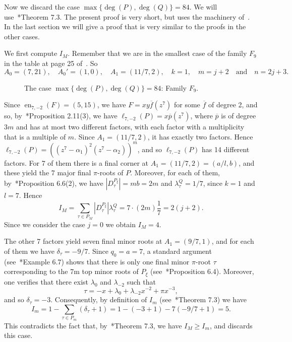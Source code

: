 \documentclass[reqno,a4paper,twoside]{amsart}
\theoremstyle{definition}
\theoremstyle{remark}
\DeclareMathOperator{\en}{en}
\newcommand{\ov}{\overline}
\begin{document}
Now we discard the case $\max\{\deg(P),\deg(Q)\}=84$. We will use~\cite{GGV6}*{Theorem 7.3}. The present proof is very short, but uses
the machinery of~\cite{GGV6}. In the last section we will give a proof that is very similar to the proofs in the other cases.

We first compute $I_M$.
Remember that we are in the smallest case of the family $F_9$ in the table at page 25 of~\cite{GGV5}. So
$$
 A_0=(7,21),\quad A_0'= (1,0),\quad A_1= (11/7,2),\quad k=1,\quad m= j+2\quad\text{and}\quad n= 2j+3. \qquad
$$

\begin{figure}[htb]
\centering
{}
\caption{The case $\max\{\deg(P),\deg(Q)\}=84$: Family $F_9$.}
\end{figure}

Since $\en_{7,-2}(F)=(5,15)$, we have $F=xy \ov{f}(z^{7})$ for some $\ov{f}$ of degree 2, and so,
by~\cite{GGV1}*{Proposition 2.11(3)}, we have $\ell_{7,-2}(P)=x \ov{p}(z^7)$, where $\ov{p}$
is of degree $3m$ and has at most two different factors, with each factor with a multiplicity that is a multiple of $m$. Since $A_1=(11/7,2)$,
it has exactly two factors. Hence
$\ell_{7,-2}(P)=((z^7-\alpha_1)^2(z^7-\alpha_2))^m$, and so $\ell_{7,-2}(P)$ has 14 different factors. For 7 of them there is a final corner at
$A_1=(11/7,2)=(a/l,b)$,
and these yield the 7 major final $\pi$-roots of $P$. Moreover, for each of them, by~\cite{GGV6}*{Proposition 6.6(2)}, we
have $|D_{\tau}^{P_{\xi}}|=mb=2m$ and $\lambda_{\tau}^{Q}=1/7$, since $k=1$ and $l=7$.
Hence
$$
I_M=\sum_{\tau\in P_M} |D_{\tau}^{P_{\xi}}|\lambda_{\tau}^{Q}= 7 \cdot (2m)\frac 17=2(j+2).
$$
Since we consider the case $j=0$ we obtain $I_M=4$.

The other 7 factors yield seven final minor roots at $A_1=(9/7,1)$, and for each of them we have $\delta_{\tau}=-9/7$. Since $q_0=a=7$, a
standard argument (see~\cite{GGV6}*{Example 6.7})
 shows that there is only one final minor $\pi$-root $\tau$ corresponding to the 7m top minor roots of $P_{\xi}$
(see~\cite{GGV6}*{Proposition 6.4}). Moreover, one verifies that there exist
$\lambda_0$ and $\lambda_{-2}$ such that
$$
\tau=-x+\lambda_0+\lambda_{-2}x^{-2}+\pi x^{-3},
$$
and so $\delta_{\tau} = -3$. Consequently, by definition of $I_m$ (see~\cite{GGV6}*{Theorem 7.3}) we have
$$
I_m=1-\sum_{\tau\in P_m} (\delta_{\tau}+1)=1-(-3+1)-7(-9/7+1)=5.
$$
This contradicts the fact that, by~\cite{GGV6}*{Theorem 7.3}, we have $I_M\ge I_m$, and discards this case.
\end{document}
